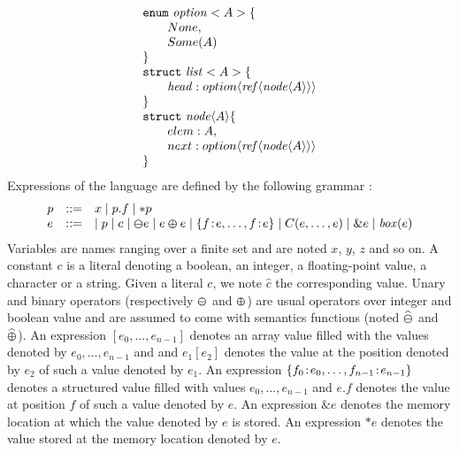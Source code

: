 \documentclass[12pt]{article}
\begin{document}
$$
  \begin{array}{l}
    {\tt{enum}}~{\mathit{option}}<A>\{                                                                                                      \\
    \qquad None,                                                                                                                      \\
    \qquad Some (A)                                                                                                                   \\
    \}                                                                                                                                \\
    {\tt{struct}}~{\mathit{list}}<A>\{                                                                                                      \\
    \qquad {\mathit{head}} : option \langle \mathit{ref}\langle {\mathit{node}\langle A\rangle}\rangle \rangle \\\} \\
    {\tt{struct}}~{\mathit{node}}\langle A\rangle \{                                                                                        \\
    \qquad elem : A,                                                                                                                  \\
    \qquad next : option \langle \mathit{ref}\langle {\mathit{node}\langle A\rangle}\rangle \rangle                                       \\
    \}
  \end{array}
$$
Expressions of the {\sail} language are defined by the following grammar :
$$
  \begin{array}{lcl}
    p&::=& x \mid p.f \mid *p\\
    e & ::= & \mid p \mid c \mid \varominus e \mid e \varoplus e \mid \{f\!:\!e,\ldots,f\!:\!e\}
    \mid C(e,\ldots,e) \mid \&e \mid {\mathit{box}}(e)
  \end{array}
$$
Variables are names ranging over a finite set and are noted $x$, $y$, $z$ and so on.
A constant $c$ is a literal denoting a boolean, an integer, a floating-point value, a character or a string.
Given a literal $c$, we note $\widehat{c}$ the corresponding value.
Unary and binary  operators (respectively $\varominus$ and $\varoplus$) are usual operators over integer and
boolean value and are assumed to come with semantics functions (noted $\widehat{\varominus}$
and $\widehat{\varoplus}$).
An expression $[e_0,\ldots,e_{n-1}]$ denotes an array value filled
with the values denoted by $e_0,\ldots,e_{n-1}$ and
and $e_1[e_2]$ denotes the value at the position denoted by $e_2$ of such a value
denoted by $e_1$.
An expression $\{f_0\!:\!e_0,\ldots, f_{n-1}\!:\!e_{n-1}\}$ denotes a
structured value filled with values $e_0,\ldots,e_{n-1}$ and $e.f$ denotes the
value at position $f$ of such a value denoted by $e$.
An expression $\&e$ denotes the memory location at which the value denoted by $e$ is stored.
An expression $*e$ denotes the value stored at the memory location denoted by $e$.
\end{document}
